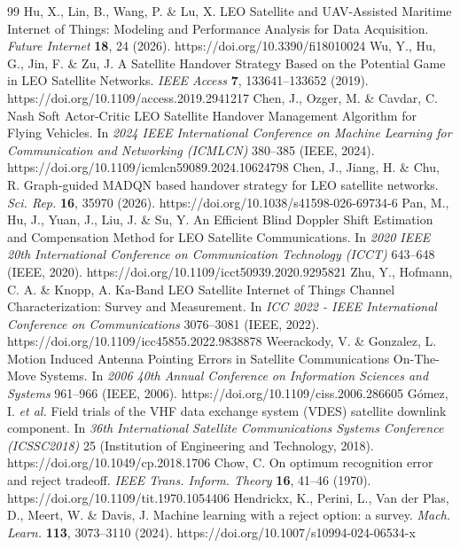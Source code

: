 \begin{thebibliography}{99}
 Hu, X., Lin, B., Wang, P. \& Lu, X. LEO Satellite and UAV-Assisted Maritime Internet of Things: Modeling and Performance Analysis for Data Acquisition. \emph{Future Internet} \textbf{18}, 24 (2026). https://doi.org/10.3390/fi18010024
 Wu, Y., Hu, G., Jin, F. \& Zu, J. A Satellite Handover Strategy Based on the Potential Game in LEO Satellite Networks. \emph{IEEE Access} \textbf{7}, 133641--133652 (2019). https://doi.org/10.1109/access.2019.2941217
 Chen, J., Ozger, M. \& Cavdar, C. Nash Soft Actor-Critic LEO Satellite Handover Management Algorithm for Flying Vehicles. In \emph{2024 IEEE International Conference on Machine Learning for Communication and Networking (ICMLCN)} 380--385 (IEEE, 2024). https://doi.org/10.1109/icmlcn59089.2024.10624798
 Chen, J., Jiang, H. \& Chu, R. Graph-guided MADQN based handover strategy for LEO satellite networks. \emph{Sci. Rep.} \textbf{16}, 35970 (2026). https://doi.org/10.1038/s41598-026-69734-6
 Pan, M., Hu, J., Yuan, J., Liu, J. \& Su, Y. An Efficient Blind Doppler Shift Estimation and Compensation Method for LEO Satellite Communications. In \emph{2020 IEEE 20th International Conference on Communication Technology (ICCT)} 643--648 (IEEE, 2020). https://doi.org/10.1109/icct50939.2020.9295821
 Zhu, Y., Hofmann, C. A. \& Knopp, A. Ka-Band LEO Satellite Internet of Things Channel Characterization: Survey and Measurement. In \emph{ICC 2022 - IEEE International Conference on Communications} 3076--3081 (IEEE, 2022). https://doi.org/10.1109/icc45855.2022.9838878
 Weerackody, V. \& Gonzalez, L. Motion Induced Antenna Pointing Errors in Satellite Communications On-The-Move Systems. In \emph{2006 40th Annual Conference on Information Sciences and Systems} 961--966 (IEEE, 2006). https://doi.org/10.1109/ciss.2006.286605
 Gómez, I. \emph{et al.} Field trials of the VHF data exchange system (VDES) satellite downlink component. In \emph{36th International Satellite Communications Systems Conference (ICSSC2018)} 25 (Institution of Engineering and Technology, 2018). https://doi.org/10.1049/cp.2018.1706
 Chow, C. On optimum recognition error and reject tradeoff. \emph{IEEE Trans. Inform. Theory} \textbf{16}, 41--46 (1970). https://doi.org/10.1109/tit.1970.1054406
 Hendrickx, K., Perini, L., Van der Plas, D., Meert, W. \& Davis, J. Machine learning with a reject option: a survey. \emph{Mach. Learn.} \textbf{113}, 3073--3110 (2024). https://doi.org/10.1007/s10994-024-06534-x

\end{thebibliography}
